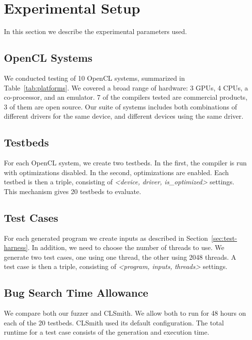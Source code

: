 \section{Experimental Setup}

In this section we describe the experimental parameters used.

\subsection{OpenCL Systems}

We conducted testing of 10 OpenCL systems, summarized in
Table~\ref{tab:platforms}.  We covered a broad range of hardware: 3 GPUs, 4
CPUs, a co-processor, and an emulator. 7 of the compilers tested are commercial
products, 3 of them are open source. Our suite of systems includes both
combinations of different drivers for the same device, and different devices
using the same driver.

\subsection{Testbeds}

For each OpenCL system, we create two testbeds. In the first, the compiler is
run with optimizations disabled. In the second, optimizations are enabled. Each
testbed is then a triple, consisting of \emph{<device, driver, is\_optimized>}
settings. This mechanism gives 20 testbeds to evaluate.


\subsection{Test Cases}

For each generated program we create inputs as described in
Section~\ref{sec:test-harness}. In addition, we need to choose the number of
threads to use. We generate two test cases, one using one thread, the other
using 2048 threads. A test case is then a triple, consisting of \emph{<program,
inputs, threads>} settings.

\subsection{Bug Search Time Allowance}

We compare both our fuzzer and CLSmith. We allow both to run for 48 hours on
each of the 20 testbeds.  CLSmith used its default configuration. The total
runtime for a test case consists of the generation and execution time.

